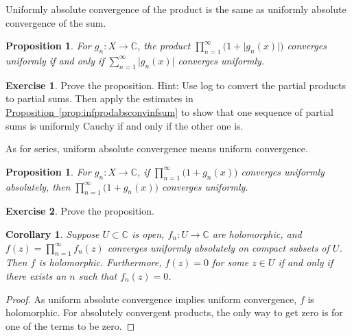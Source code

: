\documentclass[12pt,openany]{book}
\newcommand{\sabs}[1]{\lvert {#1} \rvert}
\newcommand{\C}{{\mathbb{C}}}
\theoremstyle{plain}
\newtheorem{prop}[thm]{Proposition}
\newtheorem{cor}[thm]{Corollary}
\theoremstyle{remark}
\theoremstyle{definition}
\newenvironment{exbox}{%
    \def\FrameCommand{\vrule width 1pt \relax\hspace{10pt}}%
    \MakeFramed{\advance\hsize-\width\FrameRestore}%
}{%
    \endMakeFramed
}
\theoremstyle{exercise}
\newtheorem{exercise}{Exercise}[section]
\theoremstyle{example}
\newcommand{\propref}[1]{\hyperref[#1]{Proposition~\ref*{#1}}}
\begin{document}
Uniformly absolute convergence of the product is the same as uniformly
absolute convergence of the sum.

\begin{prop}
For $g_n \colon X \to \C$, the product
$\prod_{n=1}^{\infty} \bigl(1+\sabs{g_n(x)}\bigr)$ 
converges uniformly if and only if
$\sum_{n=1}^{\infty} \sabs{g_n(x)}$ converges uniformly.
\end{prop}

\begin{exbox}
\begin{exercise}
Prove the proposition.  Hint:
Use log to convert the partial products to partial sums.
Then apply the estimates in \propref{prop:infprodabsconvinfsum} to
show that one sequence of partial sums is uniformly Cauchy if and only if
the other one is.
\end{exercise}
\end{exbox}

As for series, uniform absolute convergence means uniform
convergence.

\begin{prop} \label{prop:unifabsconvprod}
For $g_n \colon X \to \C$, if
$\prod_{n=1}^{\infty} \bigl(1+g_n(x)\bigr)$ 
converges uniformly absolutely, then
$\prod_{n=1}^{\infty} \bigl(1+g_n(x)\bigr)$ 
converges uniformly.
\end{prop}

\begin{exbox}
\begin{exercise}
Prove the proposition.
\end{exercise}
\end{exbox}

\begin{cor}
Suppose $U \subset \C$ is open, $f_n \colon U \to \C$ are holomorphic,
and $f(z) = \prod_{n=1}^\infty f_n(z)$ converges uniformly absolutely
on compact subsets of $U$.  Then $f$ is holomorphic.  Furthermore, $f(z)=0$
for some $z \in U$
if and only if there exists an $n$ such that $f_n(z)=0$.
\end{cor}

\begin{proof}
As uniform absolute convergence implies uniform convergence, $f$
is holomorphic.  For absolutely convergent products, the only
way to get zero is for one of the terms to be zero.
\end{proof}
\end{document}
